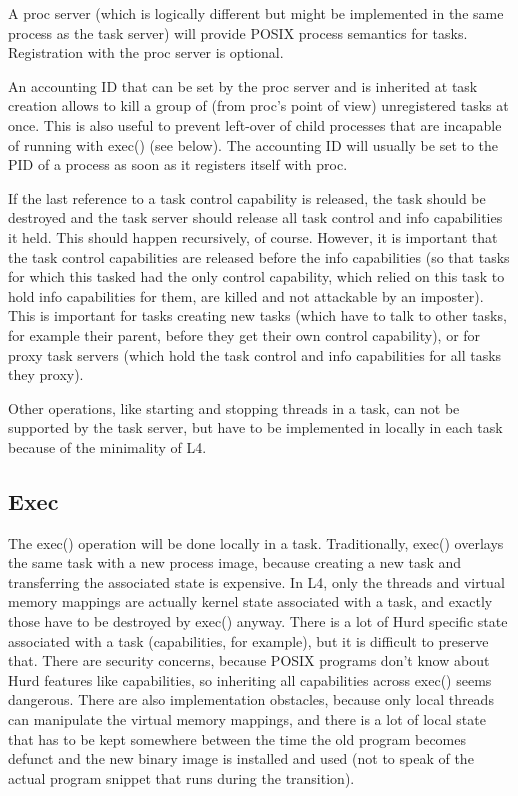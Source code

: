 \documentclass[9pt,a4paper]{extarticle}
\begin{document}
A proc server (which is logically different but might be implemented
in the same process as the task server) will provide POSIX process
semantics for tasks.  Registration with the proc server is optional.

An accounting ID that can be set by the proc server and is inherited
at task creation allows to kill a group of (from proc's point of view)
unregistered tasks at once.  This is also useful to prevent left-over
of child processes that are incapable of running with exec() (see
below).  The accounting ID will usually be set to the PID of a process
as soon as it registers itself with proc.

If the last reference to a task control capability is released, the
task should be destroyed and the task server should release all task
control and info capabilities it held.  This should happen
recursively, of course.  However, it is important that the task
control capabilities are released before the info capabilities (so
that tasks for which this tasked had the only control capability,
which relied on this task to hold info capabilities for them, are
killed and not attackable by an imposter).  This is important for
tasks creating new tasks (which have to talk to other tasks, for
example their parent, before they get their own control capability),
or for proxy task servers (which hold the task control and info
capabilities for all tasks they proxy).

Other operations, like starting and stopping threads in a task, can
not be supported by the task server, but have to be implemented in
locally in each task because of the minimality of L4.


\subsection{Exec}

The exec() operation will be done locally in a task.  Traditionally,
exec() overlays the same task with a new process image, because
creating a new task and transferring the associated state is
expensive.  In L4, only the threads and virtual memory mappings are
actually kernel state associated with a task, and exactly those have
to be destroyed by exec() anyway.  There is a lot of Hurd specific
state associated with a task (capabilities, for example), but it is
difficult to preserve that.  There are security concerns, because
POSIX programs don't know about Hurd features like capabilities, so
inheriting all capabilities across exec() seems dangerous.  There are
also implementation obstacles, because only local threads can
manipulate the virtual memory mappings, and there is a lot of local
state that has to be kept somewhere between the time the old program
becomes defunct and the new binary image is installed and used (not to
speak of the actual program snippet that runs during the transition).
\end{document}
